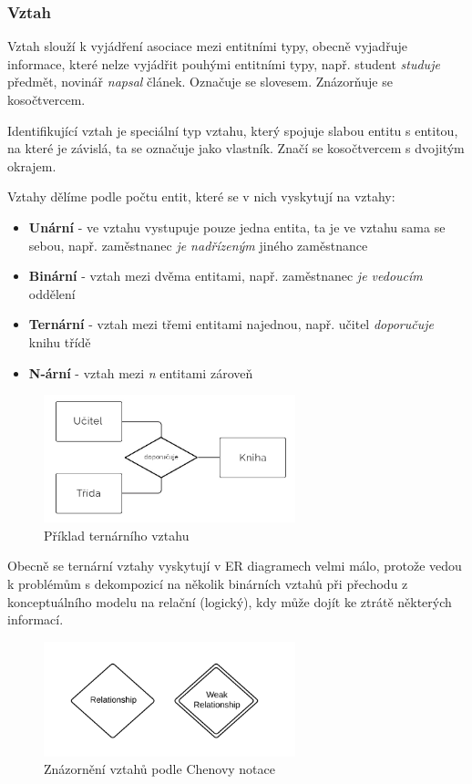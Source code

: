 \documentclass[czech,bachelor,public,dept460,male,oneside]{diploma}
\begin{document}
	\subsubsection{Vztah}
	Vztah slouží k vyjádření asociace mezi entitními typy, obecně vyjadřuje informace, které nelze vyjádřit pouhými entitními typy, např. student \textit{studuje} předmět, novinář \textit{napsal} článek. Označuje se slovesem. Znázorňuje se kosočtvercem. 
	
	Identifikující vztah je speciální typ vztahu, který spojuje slabou entitu s entitou, na které je závislá, ta se označuje jako vlastník. Značí se kosočtvercem s dvojitým okrajem.
	
	Vztahy dělíme podle počtu entit, které se v nich vyskytují na vztahy:
	
	\begin{itemize}
		\item \textbf{Unární} - ve vztahu vystupuje pouze jedna entita, ta je ve vztahu sama se sebou, např. zaměstnanec \textit{je nadřízeným} jiného zaměstnance
		\item \textbf{Binární} - vztah mezi dvěma entitami, např. zaměstnanec \textit{je vedoucím} oddělení
		\item \textbf{Ternární} - vztah mezi třemi entitami najednou, např. učitel \textit{doporučuje} knihu třídě
		\item \textbf{N-ární} - vztah mezi \textit{n} entitami zároveň
	\end{itemize}
	
	\begin{figure}[!h]
		\centering
		\includegraphics[width=0.65\textwidth]{Figures/TernaryRelationship2}
		\caption{Příklad ternárního vztahu}
	\end{figure}

	Obecně se ternární vztahy vyskytují v ER diagramech velmi málo, protože vedou k problémům s dekompozicí na několik binárních vztahů při přechodu z konceptuálního modelu na relační (logický), kdy může dojít ke ztrátě některých informací.
	
	\begin{figure}[!h]
		\centering
		\includegraphics[width=0.65\textwidth]{Figures/ChenRelationships}
		\caption[Znázornění vztahů podle Chenovy notace]{Znázornění vztahů podle Chenovy notace \cite{erdSymbols}}
	\end{figure}
\end{document}

